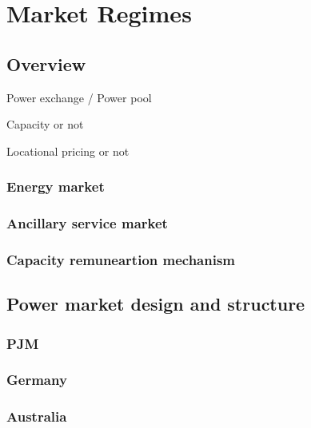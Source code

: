 \documentclass[a4paper,11pt,twoside,onecolumn]{book}
\begin{document}







\chapter{Market Regimes}
\section{Overview}
Power exchange / Power pool

Capacity or not

Locational pricing or not
\subsection{Energy market}

\subsection{Ancillary service market}

\subsection{Capacity remuneartion mechanism}


\section{Power market design and structure}
\subsection{PJM}

\subsection{Germany}

\subsection{Australia}
\end{document}
